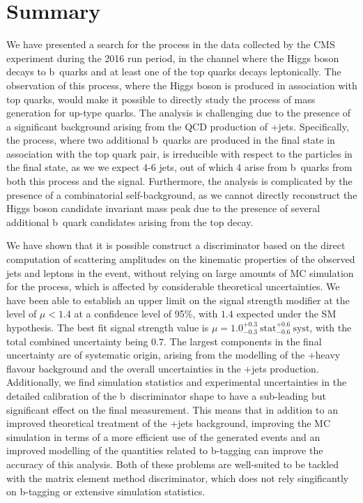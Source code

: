 \section{Summary}
\label{sec:tth_summary}
We have presented a search for the \ttH\xspace process in the data collected by the CMS experiment during the 2016 run period, in the channel where the Higgs boson decays to b~quarks and at least one of the top quarks decays leptonically. The observation of this process, where the Higgs boson is produced in association with top quarks, would make it possible to directly study the process of mass generation for up-type quarks. The analysis is challenging due to the presence of a significant background arising from the QCD production of \ttbar+jets. Specifically, the \ttbb\xspace process, where two additional b~quarks are produced in the final state in association with the top quark pair, is irreducible with respect to the particles in the final state, as we we expect 4-6 jets, out of which 4 arise from b~quarks from both this process and the \ttHbb\xspace signal. Furthermore, the analysis is complicated by the presence of a combinatorial self-background, as we cannot directly reconstruct the Higgs boson candidate invariant mass peak due to the presence of several additional b~quark candidates arising from the top decay.

We have shown that it is possible construct a discriminator based on the direct computation of scattering amplitudes on the kinematic properties of the observed jets and leptons in the event, without relying on large amounts of MC simulation for the \ttbb process, which is affected by considerable theoretical uncertainties. We have been able to establish an upper limit on the signal strength modifier at the level of $\mu < 1.4$ at a confidence level of 95\%, with $1.4$ expected under the SM hypothesis. The best fit signal strength value is $\mu = 1.0  ^{+0.3}_{-0.3}~\mathrm{stat} ^{+0.6}_{-0.6}~\mathrm{syst}$, with the total combined uncertainty being $0.7$. The largest components in the final uncertainty are of systematic origin, arising from the modelling of the \ttbar+heavy flavour background and the overall uncertainties in the \ttbar+jets production. Additionally, we find simulation statistics and experimental uncertainties in the detailed calibration of the b~discriminator shape to have a sub-leading but significant effect on the final measurement. This means that in addition to an improved theoretical treatment of the \ttbar+jets background, improving the MC simulation in terms of a more efficient use of the generated events and an improved modelling of the quantities related to b-tagging can improve the accuracy of this analysis. Both of these problems are well-suited to be tackled with the matrix element method discriminator, which does not rely singificantly on b-tagging or extensive simulation statistics.  
